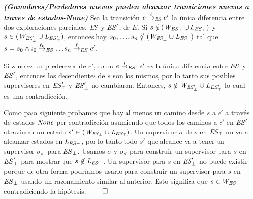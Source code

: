 \begin{lemma}\textbf{\emph{(Ganadores/Perdedores nuevos pueden alcanzar transiciones nuevas a traves de estados-\textit{None})}}
\label{lem:newWinnersLosersAreNonePredecessors}
Sea la transición $e \overset{\ell}{\rightarrow}_{\mathit{ES}} e'$ la única diferencia entre dos exploraciones parciales, $\mathit{ES}$ y $\mathit{ES}'$, de $E$. Si $s \notin (\mathit{W_{\mathit{\mathit{ES}_{\bot}}}} \cup \mathit{L_{\mathit{\mathit{ES}_{\top}}}})$ y $s \in (\mathit{W_{\mathit{\mathit{ES}'_{\bot}}}} \cup \mathit{L_{\mathit{\mathit{ES}'_{\top}}}})$, entonces hay $s_0, \ldots, s_n \notin (\mathit{W_{\mathit{\mathit{ES}_{\bot}}}} \cup \mathit{L_{\mathit{\mathit{ES}_{\top}}}})$ tal que $s = s_0 \wedge
s_0 \overset{\ell_0}{\rightarrow}_{\mathit{ES}}\ldots s_{n} \overset{\ell}{\rightarrow}_{\mathit{ES}} e'$.
\end{lemma}

\begin{Proof Sketch}
Si $s$ 
no es un predecesor de $e'$, como $e \overset{l}{\rightarrow}_{\mathit{ES}'} e'$ es la única diferencia entre $\mathit{ES}$ y $\mathit{ES}'$, entonces los decendientes de $s$ son los mismos, 
por lo tanto sus posibles supervisores en $\mathit{\mathit{ES}'_{\top}}$ y
$\mathit{\mathit{ES}'_{\bot}}$ no cambiaron. Entonces, $s \notin \mathit{W_{\mathit{\mathit{ES}'_{\bot}}}} \cup 
\mathit{L_{\mathit{\mathit{ES}'_{\top}}}}$ lo cual es una contradicción.

Como paso siguiente probamos que hay al menos un camino desde $s$ a $e'$ a través de estados $\mathit{None}$ por contradicción asumiendo que todos los caminos a $e'$ en $\mathit{ES}'$ atraviesan un estado $s' \in 
(\mathit{W_{\mathit{\mathit{ES}_{\bot}}}} \cup \mathit{L_{\mathit{\mathit{ES}_{\top}}}})$. Un supervisor $\sigma$ de $s$ en 
$\mathit{\mathit{ES}_{\top}}$ no va a alcanzar estados en $\mathit{L_{\mathit{\mathit{ES}_{\top}}}}$, 
por lo tanto todo $s'$ que alcance va a tener un supervisor $\sigma_{s'}$ para 
$\mathit{\mathit{ES}_{\bot}}$. Usamos $\sigma$ y $\sigma_{s'}$ para construir un supervisor para $s$ en $\mathit{\mathit{ES}'_{\top}}$ para mostrar que $s 
\not\in \mathit{L_{\mathit{\mathit{ES}'_{\top}}}}$.
Un supervisor para $s$ en $\mathit{\mathit{ES}'_{\bot}}$ no puede existir porque de otra forma podríamos usarlo para construir un supervisor para $s$ en 
$\mathit{\mathit{ES}_{\bot}}$ usando un razonamiento similar al anterior. Esto significa que $s \in 
\mathit{W_{\mathit{\mathit{ES}_{\bot}}}}$ contradiciendo la hipótesis. \hfill$\qed$
\end{Proof Sketch}

